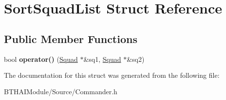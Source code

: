 \hypertarget{struct_sort_squad_list}{\section{Sort\-Squad\-List Struct Reference}
\label{struct_sort_squad_list}
}
\subsection*{Public Member Functions}
\begin{DoxyCompactItemize}
\item 
\hypertarget{struct_sort_squad_list_a4f0febe9d20e41d00eedc59270f2072f}{bool {\bfseries operator()} (\hyperlink{class_squad}{Squad} $\ast$\&sq1, \hyperlink{class_squad}{Squad} $\ast$\&sq2)}\label{struct_sort_squad_list_a4f0febe9d20e41d00eedc59270f2072f}

\end{DoxyCompactItemize}


The documentation for this struct was generated from the following file\-:\begin{DoxyCompactItemize}
\item 
B\-T\-H\-A\-I\-Module/\-Source/Commander.\-h\end{DoxyCompactItemize}
